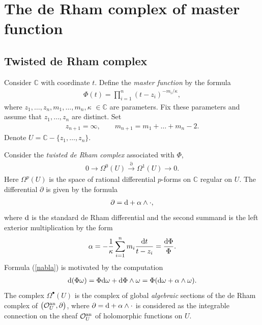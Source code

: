 \section{The de Rham complex of master function} \label{sec DR}

\subsection{Twisted de Rham complex} \label{def dr}
Consider ${\mathbb C}$ with coordinate $t$. Define the {\it master function} by the formula
\begin{gather*}%
\Phi(t) = \prod_{i=1}^n (t-z_i)^{-m_i/\kappa} ,
\end{gather*}
where $z_1, \dots, z_n, m_1,\dots,m_n, \kappa$ $\in{\mathbb C}$ are parameters. Fix these parameters and assume that $z_1,\dots,z_n$ are distinct. Set
\begin{gather*}
z_{n+1}=\infty, \qquad m_{n+1}=m_1+\dots+m_n-2.
\end{gather*}
Denote $U={\mathbb C}-\{z_1,\dots,z_n\}$.

Consider the {\em twisted de Rham complex} associated with $\Phi$,
\begin{gather}\label{dr com}
0\longrightarrow \Omega^0(U)\overset{\partial}{\longrightarrow}\Omega^1(U) \longrightarrow 0.
\end{gather}
Here $\Omega^p(U)$ is the space of rational differential $p$-forms on ${\mathbb C}$ regular on $U$. The differential $\partial$ is given by the formula
\begin{gather}\label{nabla}
\partial={\rm d}+\alpha\wedge\cdot ,
\end{gather}
where ${\rm d}$ is the standard de Rham differential and the second summand is the left exterior multiplication by the form
\begin{gather*}%
\alpha=-\frac{1}{\kappa}\sum_{i=1}^n m_i \frac{{\rm d}t}{t-z_i} =\frac{{\rm d}\Phi}\Phi.
\end{gather*}
Formula (\ref{nabla}) is motivated by the computation
\begin{gather*}
{\rm d}(\Phi\omega)=\Phi {\rm d}\omega+{\rm d}\Phi\wedge\omega=\Phi({\rm d}\omega+\alpha\wedge\omega).
\end{gather*}
The complex $\Omega^{\bullet}(U)$ is the complex of global {\em algebraic} sections of
the de Rham complex of $\big({\mathcal{O}}^{\rm an}_U,\partial\big)$, where $\partial={\rm d}+\alpha\wedge\cdot$ is considered as the integrable connection on the sheaf ${\mathcal{O}}^{\rm an}_U$ of holomorphic functions on $U$.

